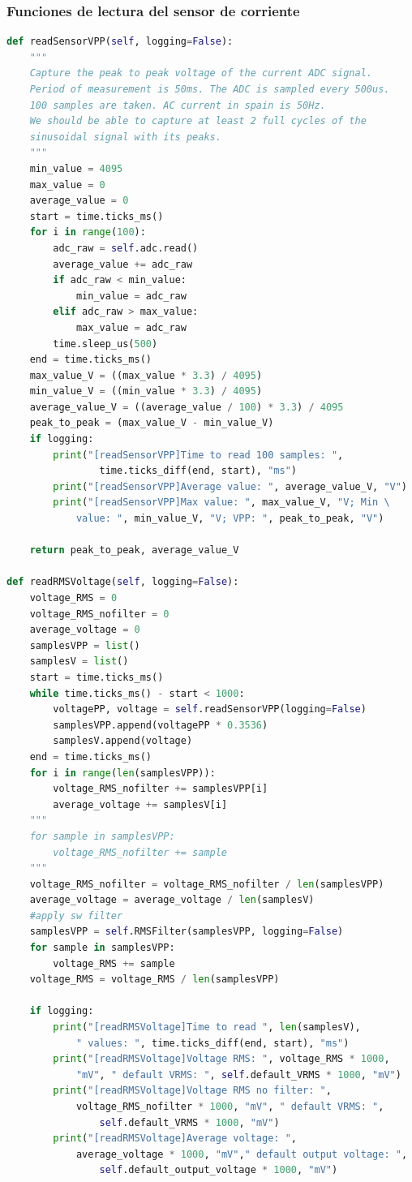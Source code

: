 \begin{titlepage}
\subsubsection{Funciones de lectura del sensor de corriente}
\begin{lstlisting}[language=python]
def readSensorVPP(self, logging=False):
	"""
	Capture the peak to peak voltage of the current ADC signal.
	Period of measurement is 50ms. The ADC is sampled every 500us. 
	100 samples are taken. AC current in spain is 50Hz.
	We should be able to capture at least 2 full cycles of the 
	sinusoidal signal with its peaks.
	"""
	min_value = 4095
	max_value = 0
	average_value = 0
	start = time.ticks_ms()
	for i in range(100):
		adc_raw = self.adc.read()
		average_value += adc_raw
		if adc_raw < min_value:
			min_value = adc_raw
		elif adc_raw > max_value:
			max_value = adc_raw
		time.sleep_us(500)
	end = time.ticks_ms()
	max_value_V = ((max_value * 3.3) / 4095)
	min_value_V = ((min_value * 3.3) / 4095)
	average_value_V = ((average_value / 100) * 3.3) / 4095
	peak_to_peak = (max_value_V - min_value_V)
	if logging:
		print("[readSensorVPP]Time to read 100 samples: ", 
				time.ticks_diff(end, start), "ms")
		print("[readSensorVPP]Average value: ", average_value_V, "V")
		print("[readSensorVPP]Max value: ", max_value_V, "V; Min \
			value: ", min_value_V, "V; VPP: ", peak_to_peak, "V")

	return peak_to_peak, average_value_V 

def readRMSVoltage(self, logging=False):
	voltage_RMS = 0
	voltage_RMS_nofilter = 0
	average_voltage = 0
	samplesVPP = list()
	samplesV = list()
	start = time.ticks_ms()
	while time.ticks_ms() - start < 1000:
		voltagePP, voltage = self.readSensorVPP(logging=False)
		samplesVPP.append(voltagePP * 0.3536)
		samplesV.append(voltage)
	end = time.ticks_ms()
	for i in range(len(samplesVPP)):
		voltage_RMS_nofilter += samplesVPP[i]
		average_voltage += samplesV[i]
	"""
	for sample in samplesVPP:
		voltage_RMS_nofilter += sample
	"""
	voltage_RMS_nofilter = voltage_RMS_nofilter / len(samplesVPP)
	average_voltage = average_voltage / len(samplesV)
	#apply sw filter
	samplesVPP = self.RMSFilter(samplesVPP, logging=False)
	for sample in samplesVPP:
		voltage_RMS += sample
	voltage_RMS = voltage_RMS / len(samplesVPP)

	if logging:
		print("[readRMSVoltage]Time to read ", len(samplesV), 
			" values: ", time.ticks_diff(end, start), "ms")
		print("[readRMSVoltage]Voltage RMS: ", voltage_RMS * 1000, 
			"mV", " default VRMS: ", self.default_VRMS * 1000, "mV")
		print("[readRMSVoltage]Voltage RMS no filter: ", 
			voltage_RMS_nofilter * 1000, "mV", " default VRMS: ", 
				self.default_VRMS * 1000, "mV")
		print("[readRMSVoltage]Average voltage: ", 
			average_voltage * 1000, "mV"," default output voltage: ", 
				self.default_output_voltage * 1000, "mV")
	

\end{lstlisting}
\end{titlepage}
